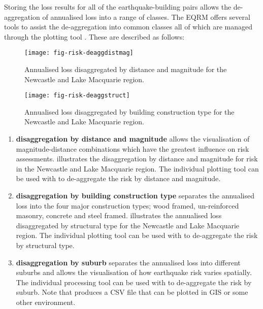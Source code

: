 Storing the loss results for all of the earthquake-building pairs
allows the de-aggregation of annualised loss into a range of
classes. The EQRM offers several tools to assist the
de-aggregation into common classes all of which are managed
through the plotting tool . These
are described as follows:
\begin{figure}
\texttt{[image: fig-risk-deaggdistmag]}
 \caption{Annualised loss
disaggregated by distance and magnitude for the Newcastle and Lake
Macquarie region.} \label{fig-risk-deaggdistmag}
\end{figure}
\begin{figure}
\texttt{[image: fig-risk-deaggstruct]}
\caption{Annualised loss disaggregated by building construction
type for the Newcastle and Lake Macquarie region.}
\label{fig-risk-deaggstruct}
\end{figure}
\begin{enumerate}
\item \textbf{disaggregation by distance and magnitude} allows the
visualisation of magnitude-distance combinations which have the
greatest influence on risk assessments.
 illustrates the disaggregation by
distance and magnitude for risk in the Newcastle and Lake
Macquarie region. The individual plotting tool
 can be used with
 to de-aggregate the risk by
distance and magnitude. \item \textbf{disaggregation by building
construction type} separates the annualised loss into the four
major construction types; wood framed, un-reinforced masonry,
concrete and steel framed.  illustrates
the annualised loss disaggregated by structural type for the
Newcastle and Lake Macquarie region. The individual plotting tool
 can be used with
 to de-aggregate the risk by
structural type. \item \textbf{disaggregation by suburb} separates
the annualised loss into different suburbs and allows the
visualisation of how earthquake risk varies spatially. The
individual processing tool
 can be used with
 to de-aggregate the risk by
suburb. Note that 
produces a CSV file that can be plotted in GIS or some other
environment.
\end{enumerate}

